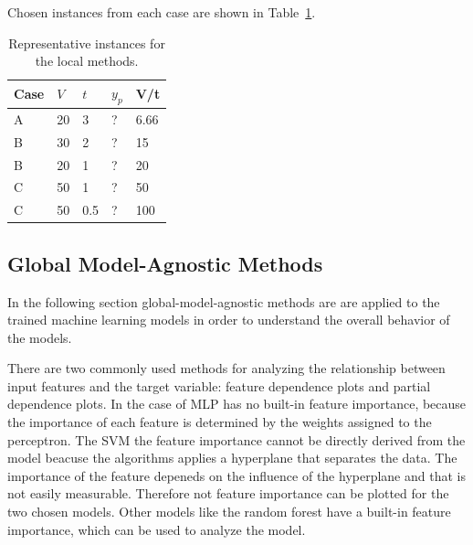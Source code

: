 Chosen instances from each case are shown in Table~\ref{tab:representative-instances}.

\begin{table}[H]
    \begin{tcolorbox}[arc=0pt,boxrule=0.5pt]
        \centering
        \begin{tabular}{lllll}
            \toprule
            \textbf{Case} & \textbf{\(V\) } & \textbf{\(t\)} & \textbf{\(y_p\)} & \textbf{V/t} \\
            \toprule
            A             & 20              & 3              & ?                & 6.66         \\
            \hdashline
            \hdashline
            B             & 30              & 2              & ?                & 15           \\
            B             & 20              & 1              & ?                & 20           \\
            \hdashline
            C             & 50              & 1              & ?                & 50           \\
            C             & 50              & 0.5            & ?                & 100          \\
            \bottomrule
        \end{tabular}
    \end{tcolorbox}
    \caption{Representative instances for the local methods.}
    \label{tab:representative-instances}
\end{table}



\subsection*{Global Model-Agnostic Methods}
In the following section global-model-agnostic methods are are applied to the trained machine
learning models in order to understand the overall behavior of the models.

There are two commonly used methods for analyzing the relationship between input features and the
target variable: feature dependence plots and partial dependence plots.
In the case of \ac{MLP} has no built-in feature importance, because the importance of each
feature is determined by the weights assigned to the perceptron.
The \ac{SVM} the feature importance cannot be directly derived from the model beacuse the
algorithms applies a hyperplane that separates the data.
The importance of the feature depeneds on the influence of the hyperplane and that is not easily
measurable.
Therefore not feature importance can be plotted for the two chosen models. Other models like the
random forest have a built-in feature importance, which can be used to analyze the model.

